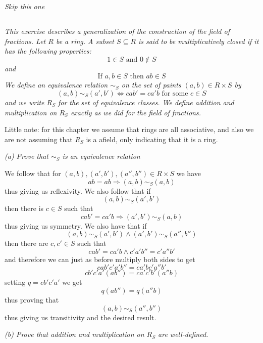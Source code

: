 \documentclass[11pt,oneside,titlepage]{book}
\DeclareMathOperator \ra {\Rightarrow}
\begin{document}
\textit{Skip this one}

\subsection{}

\textit{This exercise describes a generalization of the construction
  of the field of fractions. Let $R$ be a ring. A subset $S \subseteq R$ is
  said to be multiplicatively closed if it has the following properties:
  $$1 \in S \text{ and } 0 \notin S$$
  and
  $$\text{If } a, b \in S \text{ then } ab \in S$$
  We define an equivalence relation $\sim_S$ on the set of paints $(a,
  b) \in R \times S$ by
  $$(a, b) \sim_S (a', b') \iff cab' = ca'b \text{ for some } c \in S$$
  and we write $R_S$ for the set of equivalence classes. We define
  addition and multiplication on $R_S$ exactly as we did for the field
  of fractions.
}

Little note: for this chapter we assume that rings are all associative,
and also we are not assuming that $R_S$ is a afield, only indicating that
it is a ring.

\textit{(a) Prove that $\sim_S$ is an equivalence relation}

We follow that for $(a, b), (a', b'), (a'', b'') \in R \times S$ we have
$$ab = ab \ra (a, b) \sim_S (a, b)$$
thus giving us reflexivity. We also follow that if
$$(a, b) \sim_S (a', b')$$
then there is $c \in S$ such that 
$$cab' = ca'b \ra (a', b') \sim_S (a, b)$$
thus giving us symmetry. We also have that if
$$(a, b) \sim_S (a', b') \land (a', b') \sim_S (a'', b'') $$
then there are $c, c' \in S$ such that
$$cab' = ca'b \land c'a'b'' = c'a''b'$$
and therefore we can just as before multiply both sides to get
$$cab'c'a'b'' = ca'bc'a''b' $$
$$cb'c'a'(ab'') = ca'c'b'(a''b) $$
setting $q = cb'c'a'$ we get
$$q (ab'') = q(a''b)$$
thus proving that
$$(a, b) \sim_S (a'', b'')$$
thus giving us transitivity and the desired result.

\textit{(b) Prove that addition and multiplication on $R_S$ are
  well-defined.}
\end{document}

